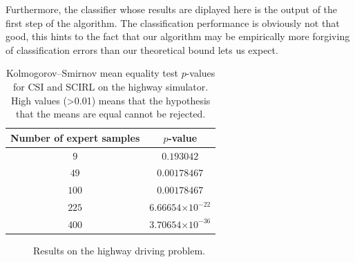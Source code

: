 \documentclass[smallextended]{svjour3}
\providecommand{\e}[1]{\ensuremath{\times 10^{#1}}}
\begin{document}
Furthermore, the classifier whose results are diplayed here is the output of the first step of the algorithm. The classification performance is obviously not that good, this hints to the fact that our algorithm may be empirically more forgiving of classification errors than our theoretical bound lets us expect.
\begin{table}[ht]
	\begin{center}
		\begin{tabular}{cc}
		\toprule
			Number of expert samples & $p$-value\\
			\midrule
			$9$ & $0.193042$\\
			$49$ & $0.00178467$\\
			$100$ & $0.00178467$\\
			$225$ & $6.66654\e{-22}$\\
			$400$ & $3.70654\e{-36}$\\
		\bottomrule
		\end{tabular}
	\end{center}
        \caption{Kolmogorov–Smirnov mean equality test $p$-values for CSI and SCIRL on the highway simulator. High values (>0.01) means that the hypothesis that the means are equal cannot be rejected.}
        \label{tab:highway}
\end{table}
  \begin{figure}
  \caption{Results on the highway driving problem.}
  \label{fig:Highway}
  
\end{figure}
\end{document}
